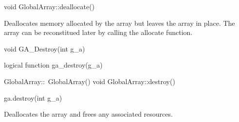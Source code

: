 \documentclass[12pt]{article}
\begin{document}
\begin{cxxapi}
\begin{cxxcode}
void GlobalArray::deallocate()
\end{cxxcode}
\end{cxxapi}

\gcoll

\begin{desc}

Deallocates memory allocated by the array but leaves the array in place. The
array can be reconstitued later by calling the allocate function.

\end{desc}



\begin{capi}
\begin{ccode}
void GA_Destroy(int g_a)
\end{ccode}
\begin{funcargs}
\end{funcargs}
\end{capi}

\begin{fapi}
\begin{fcode}
logical function ga_destroy(g_a)
\end{fcode}
\begin{funcargs}
\end{funcargs}
\end{fapi}

\begin{cxxapi}
\begin{cxxcode}
GlobalArray::~GlobalArray()
void GlobalArray::destroy()
\end{cxxcode}
\end{cxxapi}

\begin{pyapi}
\begin{pycode}
ga.destroy(int g_a)
\end{pycode}
\begin{funcargs}
\end{funcargs}
\end{pyapi}

\gcoll

\begin{desc}

Deallocates the array and frees any associated resources.

\end{desc}
\end{document}
